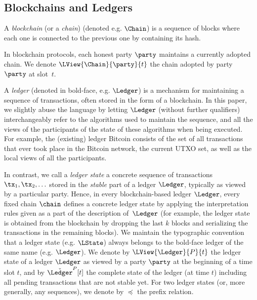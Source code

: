 \subsection{Blockchains and Ledgers}
A \emph{blockchain} (or a \emph{chain}) (denoted e.g. $\Chain$)  is a sequence
of blocks where each one is connected to the previous one by containing its
hash.

In blockchain protocols, each honest party $\party$ maintains a currently
adopted chain. We denote $\LView{\Chain}{\party}{t}$ the chain adopted by party
$\party$ at slot~$t$.

A \emph{ledger} (denoted in bold-face, e.g. $\Ledger$) is a mechanism for
maintaining a sequence of transactions, often stored in the form of a
blockchain.  In this paper, we slightly abuse the language by letting $\Ledger$
(without further qualifiers) interchangeably refer to the algorithms used to
maintain the sequence, and all the views of the participants of the state of
these algorithms when being executed.  For example, the (existing) ledger
Bitcoin consists of the set of all transactions that ever took place in the
Bitcoin network, %
the current UTXO set, as well as the
local views of all the participants.

In contrast, we call a \emph{ledger state}
a concrete sequence of transactions
$\tx_1,\tx_2, \ldots$ stored in the \emph{stable} part of a ledger $\Ledger$, typically as viewed by a
particular party.
Hence, in every blockchain-based ledger $\Ledger$, every fixed
chain $\chain$ defines a concrete ledger state %
by applying  the interpretation rules given as a part of the description
of~$\Ledger$ (for example, the ledger state is obtained from the
blockchain by dropping the last $k$ blocks and serializing the transactions in
the remaining blocks).
We maintain the typographic convention that a ledger state (e.g. $\LState$) always
belongs to the bold-face ledger of the same name (e.g. $\Ledger$).
We denote by $\LView{\Ledger}{P}{t}$ the ledger state of a ledger $\Ledger$ as viewed by a party
$\party$ at the beginning of a time slot $t$,
and by $\check{\Ledger}^P[t]$ the complete state of the ledger (at time
$t$) including all
pending transactions that are not stable yet.
For two ledger states (or, more generally, any sequences), we denote by
$\preceq$ the prefix relation.

